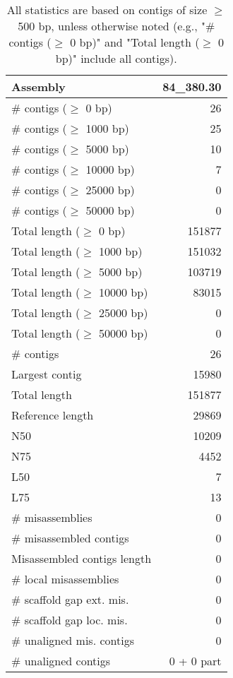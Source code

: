 \documentclass[12pt,a4paper]{article}
\begin{document}
\begin{table}[ht]
\begin{center}
\caption{All statistics are based on contigs of size $\geq$ 500 bp, unless otherwise noted (e.g., "\# contigs ($\geq$ 0 bp)" and "Total length ($\geq$ 0 bp)" include all contigs).}
\begin{tabular}{|l*{1}{|r}|}
\hline
Assembly & 84\_380.30 \\ \hline
\# contigs ($\geq$ 0 bp) & 26 \\ \hline
\# contigs ($\geq$ 1000 bp) & 25 \\ \hline
\# contigs ($\geq$ 5000 bp) & 10 \\ \hline
\# contigs ($\geq$ 10000 bp) & 7 \\ \hline
\# contigs ($\geq$ 25000 bp) & 0 \\ \hline
\# contigs ($\geq$ 50000 bp) & 0 \\ \hline
Total length ($\geq$ 0 bp) & 151877 \\ \hline
Total length ($\geq$ 1000 bp) & 151032 \\ \hline
Total length ($\geq$ 5000 bp) & 103719 \\ \hline
Total length ($\geq$ 10000 bp) & 83015 \\ \hline
Total length ($\geq$ 25000 bp) & 0 \\ \hline
Total length ($\geq$ 50000 bp) & 0 \\ \hline
\# contigs & 26 \\ \hline
Largest contig & 15980 \\ \hline
Total length & 151877 \\ \hline
Reference length & 29869 \\ \hline
N50 & 10209 \\ \hline
N75 & 4452 \\ \hline
L50 & 7 \\ \hline
L75 & 13 \\ \hline
\# misassemblies & 0 \\ \hline
\# misassembled contigs & 0 \\ \hline
Misassembled contigs length & 0 \\ \hline
\# local misassemblies & 0 \\ \hline
\# scaffold gap ext. mis. & 0 \\ \hline
\# scaffold gap loc. mis. & 0 \\ \hline
\# unaligned mis. contigs & 0 \\ \hline
\# unaligned contigs & 0 + 0 part \\ \hline

\end{tabular}
\end{center}
\end{table}
\end{document}
